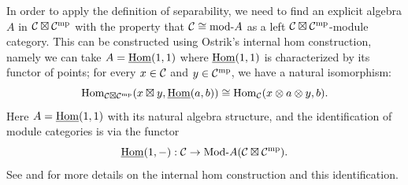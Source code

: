 \documentclass{amsart}
\begin{document}
 

In order to apply the definition of separability, we need to find an explicit algebra $A$ in $\mathcal C \boxtimes \mathcal C^{\mathrm{mp}}$ with the property that $\mathcal C \cong \text{mod-}A$ as a left $\mathcal C \boxtimes \mathcal C^{\mathrm{mp}}$-module category.  This can be constructed using Ostrik's internal hom construction, namely we can take $A = \operatorname{\underline{Hom}}(1,1)$ where $\operatorname{\underline{Hom}}(1,1)$ is characterized by its functor of points; for every $x \in \mathcal C$ and $y \in \mathcal C^{\mathrm{mp}}$, we have a natural isomorphism:
\begin{equation*}
	\operatorname{Hom}_{\mathcal C \boxtimes \mathcal C^{\mathrm{mp}}}( x \boxtimes y , \operatorname{\underline{Hom}}(a,b)) \cong \operatorname{Hom}_{\mathcal C}(x \otimes a \otimes y, b).
\end{equation*}
 Here $A = \operatorname{\underline{Hom}}(1,1)$ with its natural algebra structure, and the identification of module categories is via the functor 
\begin{equation*}
	\IHom(1, -): \cC \to \Mod{}{A}(\cC \boxtimes \cC^\mp).
\end{equation*}
See \cite{MR1976459, EO-ftc, EGNO} and \cite[\S ~\ref{sec:conventions}--3.2]{BTP} for more details on the internal hom construction and this identification.


\end{document}
